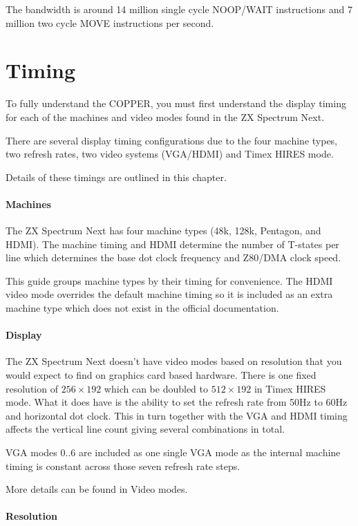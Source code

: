 The bandwidth is around 14 million single cycle NOOP/WAIT instructions
and 7 million two cycle MOVE instructions per second.

\section{Timing}

To fully understand the COPPER, you must first understand the display
timing for each of the machines and video modes found in the ZX
Spectrum Next.

There are several display timing configurations due to the four
machine types, two refresh rates, two video systems (VGA/HDMI) and
Timex HIRES mode.

Details of these timings are outlined in this chapter.

\paragraph{Machines}

The ZX Spectrum Next has four machine types (48k, 128k, Pentagon, and
HDMI). The machine timing and HDMI determine the number of T-states
per line which determines the base dot clock frequency and Z80/DMA
clock speed.

This guide groups machine types by their timing for convenience. The
HDMI video mode overrides the default machine timing so it is included
as an extra machine type which does not exist in the official
documentation.

\paragraph{Display}

The ZX Spectrum Next doesn't have video modes based on resolution that
you would expect to find on graphics card based hardware. There is one
fixed resolution of $256\times192$ which can be doubled to
$512\times192$ in Timex HIRES mode. What it does have is the ability
to set the refresh rate from 50Hz to 60Hz and horizontal dot
clock. This in turn together with the VGA and HDMI timing affects the
vertical line count giving several combinations in total.

VGA modes 0..6 are included as one single VGA mode as the internal
machine timing is constant across those seven refresh rate steps.

More details can be found in Video modes.

\paragraph{Resolution}

